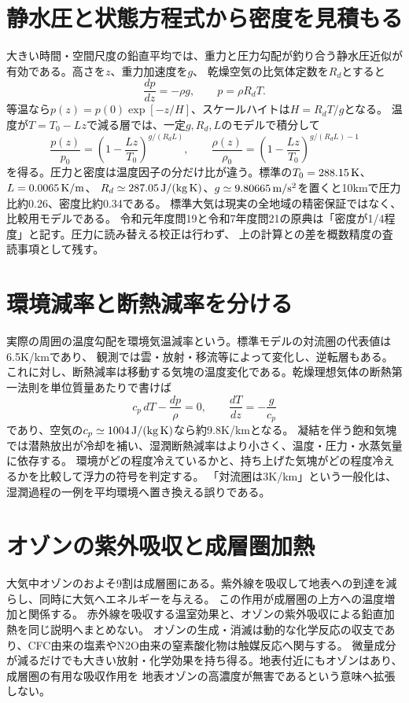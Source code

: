 \section{静水圧と状態方程式から密度を見積もる}
\label{theory:atmosphere:hydrostatic}
大きい時間・空間尺度の鉛直平均では、重力と圧力勾配が釣り合う静水圧近似が有効である。高さを\(z\)、重力加速度を\(g\)、
乾燥空気の比気体定数を\(R_d\)とすると
\[
 \frac{dp}{dz}=-\rho g,\qquad p=\rho R_dT.
\]
等温なら\(p(z)=p(0)\exp[-z/H]\)、スケールハイトは\(H=R_dT/g\)となる。
温度が\(T=T_0-Lz\)で減る層では、一定\(g,R_d,L\)のモデルで積分して
\[
 \frac{p(z)}{p_0}=\left(1-\frac{Lz}{T_0}\right)^{g/(R_dL)},\qquad
 \frac{\rho(z)}{\rho_0}=\left(1-\frac{Lz}{T_0}\right)^{g/(R_dL)-1}
\]
を得る。圧力と密度は温度因子の分だけ比が違う。標準の\(T_0=288.15\,{\rm K}\)、\(L=0.0065\,{\rm K/m}\)、
\(R_d\simeq287.05\,{\rm J/(kg\,K)}\)、\(g\simeq9.80665\,{\rm m/s^2}\)を置くと10kmで圧力比約0.26、密度比約0.34である。
標準大気は現実の全地域の精密保証ではなく、比較用モデルである\cite{atm_us1976}。
令和元年度問19と令和7年度問21の原典は「密度が1/4程度」と記す。圧力に読み替える校正は行わず、
上の計算との差を概数精度の査読事項として残す。

\section{環境減率と断熱減率を分ける}
\label{theory:atmosphere:lapse}
実際の周囲の温度勾配を環境気温減率という。標準モデルの対流圏の代表値は6.5K/kmであり、
観測では雲・放射・移流等によって変化し、逆転層もある。
これに対し、断熱減率は移動する気塊の温度変化である。乾燥理想気体の断熱第一法則を単位質量あたりで書けば
\[
 c_p\,dT-\frac{dp}{\rho}=0,\qquad
 \frac{dT}{dz}=-\frac{g}{c_p}
\]
であり、空気の\(c_p\simeq1004\,{\rm J/(kg\,K)}\)なら約9.8K/kmとなる。
凝結を伴う飽和気塊では潜熱放出が冷却を補い、湿潤断熱減率はより小さく、温度・圧力・水蒸気量に依存する。
環境がどの程度冷えているかと、持ち上げた気塊がどの程度冷えるかを比較して浮力の符号を判定する。
「対流圏は3K/km」という一般化は、湿潤過程の一例を平均環境へ置き換える誤りである。

\section{オゾンの紫外吸収と成層圏加熱}
\label{theory:atmosphere:ozone}
大気中オゾンのおよそ9割は成層圏にある。紫外線を吸収して地表への到達を減らし、同時に大気へエネルギーを与える。
この作用が成層圏の上方への温度増加と関係する\cite{atm_jma_ozone}。
赤外線を吸収する温室効果と、オゾンの紫外吸収による鉛直加熱を同じ説明へまとめない。
オゾンの生成・消滅は動的な化学反応の収支であり、CFC由来の塩素やN2O由来の窒素酸化物は触媒反応へ関与する。
微量成分が減るだけでも大きい放射・化学効果を持ち得る。地表付近にもオゾンはあり、成層圏の有用な吸収作用を
地表オゾンの高濃度が無害であるという意味へ拡張しない。

